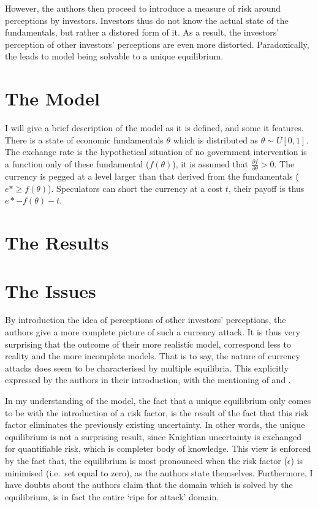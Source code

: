 \documentclass[a4paper]{report}
\begin{document}
\begin{refsection}
However, the authors then proceed to introduce a measure of risk around perceptions by investors.
Investors thus do not know the actual state of the fundamentals, but rather a distored form of it.
As a result, the investors' perception of other investors' perceptions are even more distorted.
Paradoxically, the leads to model being solvable to a unique equilibrium.

\section{The Model}
\label{unc:model}
I will give a brief description of the model as it is defined, and some it features.
There is a state of economic fundamentals $\theta$ which is distributed as $\theta \sim U[0,1]$.
The exchange rate is the hypothetical situation of no government intervention is a function only of these fundamental ($f(\theta)$),
it is assumed that $\frac{\partial f}{\partial \theta} > 0$.
The currency is pegged at a level larger than that derived from the fundamentals ($e* \geq f(\theta)$).
Speculators can short the currency at a cost $t$, their payoff is thus $e* - f(\theta) - t$.

\section{The Results}
\label{unc:results}


\section{The Issues}
\label{unc:issues}
By introduction the idea of perceptions of other investors' perceptions, the authors give a more complete picture of such a currency attack.
It is thus very surprising that the outcome of their more realistic model, correspond less to reality and the more incomplete models.
That is to say, the nature of currency attacks does seem to be characterised by multiple equilibria.
This explicitly expressed by the authors in their introduction, with the mentioning of \textcite{eichengreen1993unstable} and \textcite{dornbusch1994mexico}.

In my understanding of the model, the fact that a unique equilibrium only comes to be with the introduction of a risk factor,
is the result of the fact that this risk factor eliminates the previously existing uncertainty.
In other words, the unique equilibrium is not a surprising result, since Knightian uncertainty is exchanged for quantifiable risk,
which is completer body of knowledge.
This view is enforced by the fact that,
the equilibrium is most pronounced when the risk factor ($\epsilon$) is minimised (i.e.~set equal to zero),
as the authors state themselves.
Furthermore, I have doubts about the authors claim that the domain which is solved by the equilibrium,
is in fact the entire `ripe for attack' domain.


\end{refsection}
\end{document}
